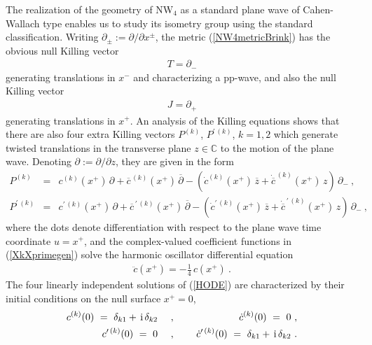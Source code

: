 \documentclass[11pt,a4paper]{article}
\newcommand{\ii}{{\rm i}}
\def\ii{{\,{\rm i}\,}}
\newcommand{\complex}{{\mathbb C}} %
\def\nn{\nonumber}
\def\bea{\begin{eqnarray}}
\def\eea{\end{eqnarray}}
\newcommand{\beq}{\begin{eqnarray}}
\newcommand{\eeq}{\end{eqnarray}}
\begin{document}
The realization of the geometry of NW$_4$ as a standard plane wave of
Cahen-Wallach type enables us to study its isometry group using the
standard classification. Writing $\partial_\pm:=\partial/\partial
x^\pm$, the metric (\ref{NW4metricBrink}) has the obvious null Killing
vector
\beq
T=\partial_-
\label{ZKilling}\eeq
generating translations in $x^-$ and characterizing a pp-wave, and
also the null Killing vector
\beq
J=\partial_+
\label{HKilling}\eeq
generating translations in $x^+$. An
analysis of the Killing equations shows that there are also four extra
Killing vectors $P^{(k)}$, $P^{\prime\,(k)}$, $k=1,2$ which generate
twisted translations in the transverse plane $z\in\complex$ to
the motion of the plane wave. Denoting $\partial:=\partial/\partial
z$, they are given in the form
\bea
P^{(k)}&=&c^{(k)}(x^+)\,\partial+\overline{c}^{\,(k)}(x^+)\,
\overline{\partial}-\left(\dot c^{(k)}(x^+)\,\overline{z}+
\dot{\overline{c}}^{\,(k)}(x^+)\,z\right)\,\partial_- \ , \nn\\
P^{\prime\,(k)}&=&c^{\prime\,(k)}(x^+)\,\partial+\overline{c}^{\,
\prime\,(k)}(x^+)\,
\overline{\partial}-\left(\dot c^{\prime\,(k)}(x^+)\,\overline{z}+
\dot{\overline{c}}^{\,\prime\,(k)}(x^+)\,z\right)\,\partial_- \ ,
\label{XkXprimegen}\eea
where the dots denote differentiation with respect to the plane
wave time coordinate $u=x^+$, and the complex-valued coefficient functions in
(\ref{XkXprimegen}) solve the harmonic oscillator differential
equation
\beq
\ddot c(x^+)=-\mbox{$\frac14$}\,c(x^+) \ .
\label{HODE}\eeq
The four linearly independent solutions of (\ref{HODE}) are
characterized by their initial conditions on the null surface $x^+=0$,
\bea
c^{(k)}(0)~=~\delta_{k1}+\ii\delta_{k2} ~~~~ &,& ~~~~ \dot c^{(k)}(0)~=~0
\ , \nn\\c^{\prime\,(k)}(0)~=~0 ~~~~ &,& ~~~~ \dot
c^{\prime\,(k)}(0)~=~\delta_{k1}+\ii\delta_{k2} \ .
\label{cinitialconds}\eea
\end{document}
